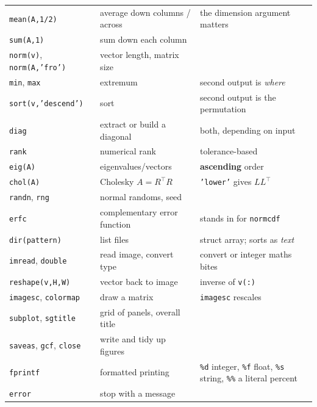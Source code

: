 \begin{center}
\begin{tabular}{llp{6.4cm}}
\texttt{mean(A,1/2)} & average down columns / across & the dimension argument matters \\
\texttt{sum(A,1)} & sum down each column & \\
\texttt{norm(v)}, \texttt{norm(A,'fro')} & vector length, matrix size & \\
\texttt{min}, \texttt{max} & extremum & second output is \emph{where} \\
\texttt{sort(v,'descend')} & sort & second output is the permutation \\
\texttt{diag} & extract or build a diagonal & both, depending on input \\
\texttt{rank} & numerical rank & tolerance-based \\
\texttt{eig(A)} & eigenvalues/vectors & \textbf{ascending} order \\
\texttt{chol(A)} & Cholesky $A = R^{\!\top}R$ & \texttt{'lower'} gives $LL^{\!\top}$ \\
\texttt{randn}, \texttt{rng} & normal randoms, seed & \\
\texttt{erfc} & complementary error function & stands in for \texttt{normcdf} \\
\midrule
\texttt{dir(pattern)} & list files & struct array; sorts as \emph{text} \\
\texttt{imread}, \texttt{double} & read image, convert type & convert or integer maths bites \\
\texttt{reshape(v,H,W)} & vector back to image & inverse of \texttt{v(:)} \\
\texttt{imagesc}, \texttt{colormap} & draw a matrix & \texttt{imagesc} rescales \\
\texttt{subplot}, \texttt{sgtitle} & grid of panels, overall title & \\
\texttt{saveas}, \texttt{gcf}, \texttt{close} & write and tidy up figures & \\
\texttt{fprintf} & formatted printing & \texttt{\%d} integer, \texttt{\%f} float, \texttt{\%s} string, \texttt{\%\%} a literal percent \\
\texttt{error} & stop with a message & \\
\bottomrule
\end{tabular}
\end{center}
